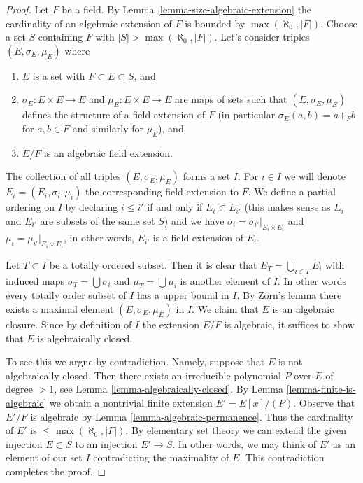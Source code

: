 \documentclass{stacks-project}
\theoremstyle{plain}
\theoremstyle{definition}
\theoremstyle{remark}
\numberwithin{equation}{subsection}
\begin{document}
\begin{proof}
Let $F$ be a field. By Lemma \ref{lemma-size-algebraic-extension} the
cardinality of an algebraic extension of $F$ is bounded by
$\max(\aleph_0, |F|)$. Choose a set $S$ containing $F$ with
$|S| > \max(\aleph_0, |F|)$. Let's consider triples
$(E, \sigma_E, \mu_E)$ where
\begin{enumerate}
\item $E$ is a set with $F \subset E \subset S$, and
\item $\sigma_E : E \times E \to E$ and $\mu_E : E \times E \to E$
are maps of sets such that $(E, \sigma_E, \mu_E)$ defines the structure
of a field extension of $F$ (in particular $\sigma_E(a, b) = a +_F b$
for $a, b \in F$ and similarly for $\mu_E$), and
\item $E/F$ is an algebraic field extension.
\end{enumerate}
The collection of all triples $(E, \sigma_E, \mu_E)$ forms a set $I$.
For $i \in I$ we will denote $E_i = (E_i, \sigma_i, \mu_i)$ the
corresponding field extension to $F$. We define a partial ordering on
$I$ by declaring $i \leq i'$ if and only if $E_i \subset E_{i'}$
(this makes sense as $E_i$ and $E_{i'}$ are subsets of the same set $S$)
and we have $\sigma_i = \sigma_{i'}|_{E_i \times E_i}$ and
$\mu_i = \mu_{i'}|_{E_i \times E_i}$, in other words, $E_{i'}$ is a field
extension of $E_i$.

\medskip\noindent
Let $T \subset I$ be a totally ordered subset. Then it is clear that
$E_T = \bigcup_{i \in T} E_i$ with induced maps $\sigma_T = \bigcup \sigma_i$
and $\mu_T = \bigcup \mu_i$ is another element of $I$. In other words
every totally order subset of $I$ has a upper bound in $I$. By Zorn's lemma
there exists a maximal element $(E, \sigma_E, \mu_E)$ in $I$. We claim that
$E$ is an algebraic closure. Since by definition of $I$ the extension
$E/F$ is algebraic, it suffices to show that $E$ is algebraically closed.

\medskip\noindent
To see this we argue by contradiction. Namely, suppose that $E$ is not
algebraically closed. Then there exists an irreducible polynomial
$P$ over $E$ of degree $> 1$, see Lemma \ref{lemma-algebraically-closed}.
By Lemma \ref{lemma-finite-is-algebraic} we obtain a nontrivial finite
extension $E' = E[x]/(P)$. Observe that $E'/F$ is algebraic by
Lemma \ref{lemma-algebraic-permanence}.
Thus the cardinality of $E'$ is $\leq \max(\aleph_0, |F|)$.
By elementary set theory we can extend the given injection
$E \subset S$ to an injection $E' \to S$. In other words, we may
think of $E'$ as an element of our set $I$ contradicting the
maximality of $E$. This contradiction completes the proof.
\end{proof}
\end{document}
